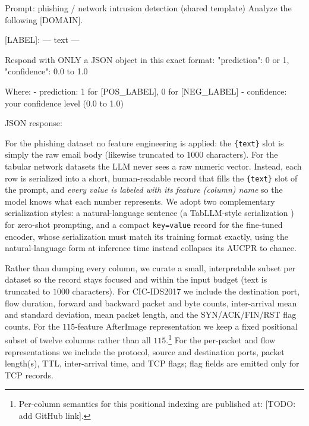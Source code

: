 \documentclass{jmlr}
\begin{document}
\begin{promptbox}{Prompt: phishing / network intrusion detection (shared template)}
Analyze the following [DOMAIN].

[LABEL]:
---
{text}
---

Respond with ONLY a JSON object in this exact format:
{{"prediction": 0 or 1, "confidence": 0.0 to 1.0}}

Where:
- prediction: 1 for [POS_LABEL], 0 for [NEG_LABEL]
- confidence: your confidence level (0.0 to 1.0)

JSON response:
\end{promptbox}
\label{fig:prompt-template}

For the phishing dataset no feature engineering is applied: the \texttt{\{text\}} slot is simply the raw email body (likewise truncated to $1000$ characters). For the tabular network datasets the LLM never sees a raw numeric vector. Instead, each row is serialized into a short, human-readable record that fills the \texttt{\{text\}} slot of the prompt, and \emph{every value is labeled with its feature (column) name} so the model knows what each number represents. We adopt two complementary serialization styles: a natural-language sentence (a TabLLM-style serialization \citep{hegselmann2023tabllm}) for zero-shot prompting, and a compact \texttt{key=value} record for the fine-tuned encoder, whose serialization must match its training format exactly, using the natural-language form at inference time instead collapses its AUCPR to chance.

Rather than dumping every column, we curate a small, interpretable subset per dataset so the record stays focused and within the input budget (text is truncated to $1000$ characters). For CIC-IDS2017 we include the destination port, flow duration, forward and backward packet and byte counts, inter-arrival mean and standard deviation, mean packet length, and the SYN/ACK/FIN/RST flag counts. For the $115$-feature AfterImage representation we keep a fixed positional subset of twelve columns rather than all $115$.\footnote{Per-column semantics for this positional indexing are published at: [TODO: add GitHub link].} For the per-packet and flow representations we include the protocol, source and destination ports, packet length(s), TTL, inter-arrival time, and TCP flags; flag fields are emitted only for TCP records. 
\end{document}
